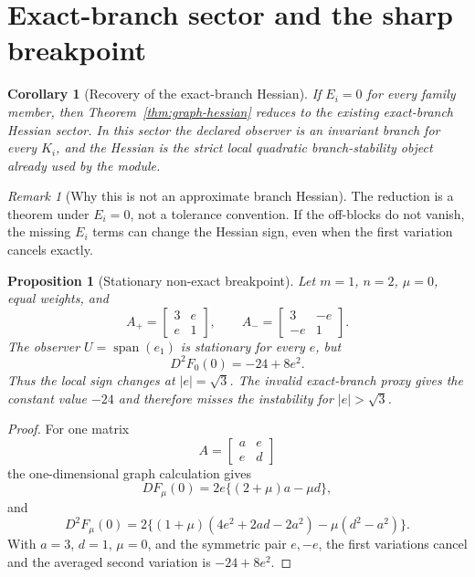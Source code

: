 \documentclass[11pt,a4paper]{article}
\numberwithin{equation}{section}
\theoremstyle{thmcompact}
\newtheorem{proposition}[theorem]{Proposition}
\newtheorem{corollary}[theorem]{Corollary}
\theoremstyle{remark}
\newtheorem*{remarkplain}{Remark}
\newenvironment{remark}[1][]%
{\begin{remarkbox}\begin{remarkplain}[#1]\normalfont}
{\end{remarkplain}\end{remarkbox}}
\begin{document}
\section{Exact-branch sector and the sharp breakpoint}

\begin{corollary}[Recovery of the exact-branch Hessian]
If $E_i=0$ for every family member, then Theorem~\ref{thm:graph-hessian} reduces to the existing exact-branch Hessian sector. In this sector the declared observer is an invariant branch for every $K_i$, and the Hessian is the strict local quadratic branch-stability object already used by the module.
\end{corollary}

\begin{remark}[Why this is not an approximate branch Hessian]
The reduction is a theorem under $E_i=0$, not a tolerance convention. If the off-blocks do not vanish, the missing $E_i$ terms can change the Hessian sign, even when the first variation cancels exactly.
\end{remark}

\begin{proposition}[Stationary non-exact breakpoint]
\label{prop:symmetric-breakpoint}
Let $m=1$, $n=2$, $\mu=0$, equal weights, and
\[
A_+=
\begin{bmatrix}3&e\\ e&1\end{bmatrix},
\qquad
A_-=
\begin{bmatrix}3&-e\\ -e&1\end{bmatrix}.
\]
The observer $U=\operatorname{span}(e_1)$ is stationary for every $e$, but
\[
D^2F_0(0)=-24+8e^2.
\]
Thus the local sign changes at $|e|=\sqrt3$. The invalid exact-branch proxy gives the constant value $-24$ and therefore misses the instability for $|e|>\sqrt3$.
\end{proposition}

\begin{proof}
For one matrix
\[
A=\begin{bmatrix}a&e\\e&d\end{bmatrix}
\]
the one-dimensional graph calculation gives
\[
DF_\mu(0)=2e\{(2+\mu)a-\mu d\},
\]
and
\[
D^2F_\mu(0)
=
2\{(1+\mu)(4e^2+2ad-2a^2)-\mu(d^2-a^2)\}.
\]
With $a=3$, $d=1$, $\mu=0$, and the symmetric pair $e,-e$, the first variations cancel and the averaged second variation is $-24+8e^2$.
\end{proof}
\end{document}
